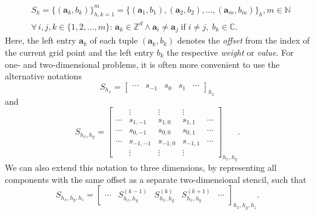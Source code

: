 \begin{equation}
	\begin{split}
			& S_h = \{(\bm{a}_k, b_k) \}_{h,k=1}^m = \{(\bm{a}_1, b_1),  (\bm{a}_2, b_2), \dots, (\bm{a}_m, b_m)\}_h, m \in \mathbb{N}
	\\ & \forall \, i, j, k \in \{1, 2, \dots, m \}: \,
	\bm{a}_k \in \mathbb{Z}^d \wedge \bm{a}_i \neq \bm{a}_j \; \text{if} \; i \neq j, \; b_k \in \mathbb{C}.
	\end{split}
\label{eq:stencil-definition}
\end{equation}
Here, the left entry $\bm{a}_k$ of each tuple $(\bm{a}_k, b_k)$ denotes the \emph{offset} from the index of the current grid point and the left entry $b_k$ the respective \emph{weight} or \emph{value}.
For one- and two-dimensional problems, it is often more convenient to use the alternative notations 
\begin{equation}
	S_{h_x} = \begin{bmatrix}
		\cdots & s_{-1} & s_{0} & s_{1} & \cdots
	\end{bmatrix}_{h_x}
\end{equation}
and
\begin{equation}
	S_{h_x, h_y} = \begin{bmatrix}
		& \vdots & \vdots & \vdots & \\
		\cdots & s_{1,-1} & s_{1,0} & s_{1,1} & \cdots \\
		\cdots & s_{0,-1} & s_{0,0} & s_{0,1} & \cdots \\
		\cdots & s_{-1,-1} & s_{-1,0} & s_{-1,1} & \cdots \\
		& \vdots & \vdots & \vdots &
	\end{bmatrix}_{h_x, h_y}.
\end{equation}
We can also extend this notation to three dimensions, by representing all components with the same offset as a separate two-dimensional stencil, such that
\begin{equation}
	S_{h_x, h_y, h_z} = 
	\begin{bmatrix}
		\cdots & S_{h_x, h_y}^{(k-1)} & S_{h_x, h_y}^{(k)} & S_{h_x, h_y}^{(k+1)} & \cdots 
	\end{bmatrix}_{h_x, h_y, h_z}.
\label{eq:3D-stencil-matrix-notation}
\end{equation}

